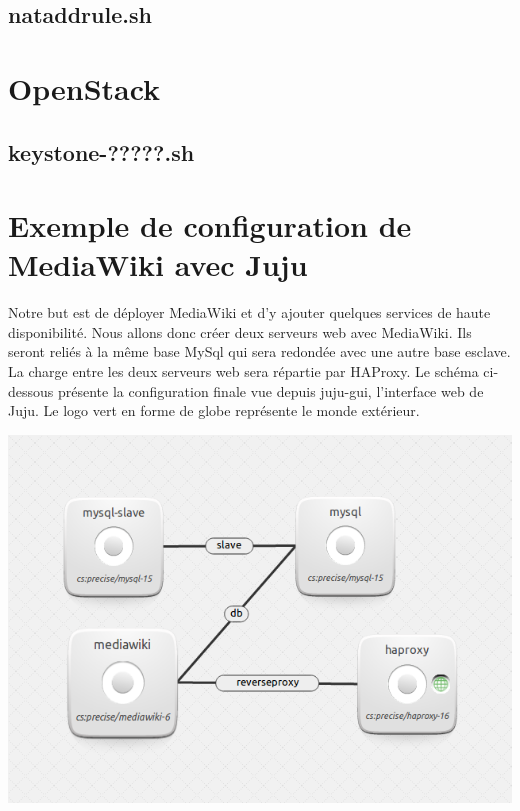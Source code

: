 \documentclass[a4paper,oneside]{report}
\begin{document}
\subsection{nataddrule.sh}

\section{OpenStack}
\subsection{keystone-?????.sh} \label{script:keystoneData}

\section{Exemple de configuration de MediaWiki avec Juju} \label{auto:juju}

Notre but est de déployer MediaWiki et d'y ajouter quelques services de haute disponibilité. Nous allons donc créer deux serveurs web avec MediaWiki. Ils seront reliés à la même base MySql qui sera redondée avec une autre base esclave. La charge entre les deux serveurs web sera répartie par HAProxy. Le schéma ci-dessous présente la configuration finale vue depuis juju-gui, l'interface web de Juju. Le logo vert en forme de globe représente le monde extérieur.
\begin{center}
\includegraphics[scale=0.75]{images/butJuju.png}
\end{center}
\end{document}
